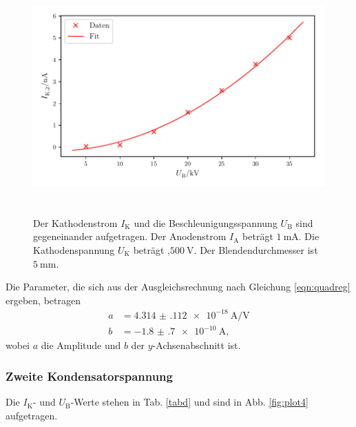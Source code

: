 

\begin{figure}
    \centering
    \includegraphics[width=15cm, height=9cm]{build/plot3.pdf}
    \caption{Der Kathodenstrom $I_\text{K}$ und die Beschleunigungsspannung $U_\text{B}$ sind gegeneinander aufgetragen. Der Anodenstrom $I_\text{A}$ beträgt $\SI{1}{\milli\ampere}$. Die Kathodenspannung $U_\text{K}$ beträgt ,$\SI{500}{\volt}$. Der Blendendurchmesser ist $\SI{5}{\milli\meter}.$}
    \label{fig:plot3}
\end{figure}

\noindent Die Parameter, die sich aus der Ausgleichsrechnung nach Gleichung \eqref{eqn:quadreg} ergeben, betragen
\begin{align*}
    a &= \SI{4.314(112)e-18}{\ampere\per\volt}\\
    b &= \SI{-1.8(7)e-10}{\ampere},
\end{align*}
wobei $a$ die Amplitude und $b$ der $y$-Achsenabschnitt ist. 

\subsubsection{Zweite Kondensatorspannung}
Die $I_\text{K}$- und $U_\text{B}$-Werte stehen in Tab. \ref{tabd} und sind in Abb. \ref{fig:plot4} aufgetragen. 

